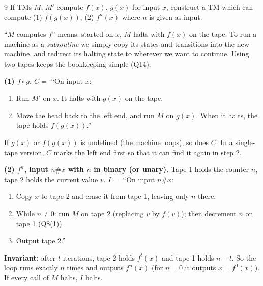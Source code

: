 \begin{question}{9}
If TMs $M$, $M'$ compute $f(x)$, $g(x)$ for input $x$, construct a TM which can compute (1) $f(g(x))$, (2) $f^n(x)$ where $n$ is given as input.
\end{question}
\begin{soln}
``$M$ computes $f$'' means: started on $x$, $M$ halts with $f(x)$ on the tape. To run a machine as a \emph{subroutine} we simply copy its states and transitions into the new machine, and redirect its halting state to wherever we want to continue. Using two tapes keeps the bookkeeping simple (Q14).

\textbf{(1) $f\circ g$.}
$C=$ ``On input $x$:
\begin{enumerate}
\item Run $M'$ on $x$. It halts with $g(x)$ on the tape.
\item Move the head back to the left end, and run $M$ on $g(x)$. When it halts, the tape holds $f(g(x))$.''
\end{enumerate}
If $g(x)$ or $f(g(x))$ is undefined (the machine loops), so does $C$. In a single-tape version, $C$ marks the left end first so that it can find it again in step 2.

\textbf{(2) $f^n$, input $n\#x$ with $n$ in binary (or unary).}
Tape 1 holds the counter $n$, tape 2 holds the current value $v$.
$I=$ ``On input $n\#x$:
\begin{enumerate}
\item Copy $x$ to tape 2 and erase it from tape 1, leaving only $n$ there.
\item While $n\neq0$: run $M$ on tape 2 (replacing $v$ by $f(v)$); then decrement $n$ on tape 1 (Q8(1)).
\item Output tape 2.''
\end{enumerate}
\textbf{Invariant:} after $t$ iterations, tape 2 holds $f^t(x)$ and tape 1 holds $n-t$. So the loop runs exactly $n$ times and outputs $f^n(x)$ (for $n=0$ it outputs $x=f^0(x)$). If every call of $M$ halts, $I$ halts.
\end{soln}

